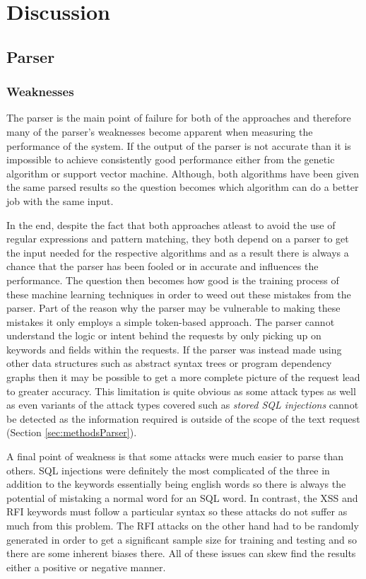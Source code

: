 \chapter{Discussion} \label{sec:sectionSeven}

\section{Parser}
\subsection{Weaknesses}\label{sec:parseWeak}

The parser is the main point of failure for both of the approaches and therefore many of the parser's weaknesses become apparent when measuring the performance of the system.  If the output of the parser is not accurate than it is impossible to achieve consistently good performance either from the genetic algorithm or support vector machine. Although, both algorithms have been given the same parsed results so the question becomes which algorithm can do a better job with the same input.  

In the end, despite the fact that both approaches atleast to avoid the use of regular expressions and pattern matching, they both depend on a parser to get the input needed for the respective algorithms and as a result there is always a chance that the parser has been fooled or in accurate and influences the performance.  The question then becomes how good is the training process of these machine learning techniques in order to weed out these mistakes from the parser.  Part of the reason why the parser may be vulnerable to making these mistakes it only employs a simple token-based approach.  The parser cannot understand the logic or intent behind the requests by only picking up on keywords and fields within the requests.  If the parser was instead made using other data structures such as abstract syntax trees or program dependency graphs then it may be possible to get a more complete picture of the request lead to greater accuracy.  This limitation is quite obvious as some attack types as well as even variants of the attack types covered such as \textit{stored SQL injections} cannot be detected as the information required is outside of the scope of the text request (Section \ref{sec:methodsParser}). 

A final point of weakness is that some attacks were much easier to parse than others.  SQL injections were definitely the most complicated of the three in addition to the keywords essentially being english words so there is always the potential of mistaking a normal word for an SQL word.  In contrast, the XSS and RFI keywords must follow a particular syntax so these attacks do not suffer as much from this problem.  The RFI attacks on the other hand had to be randomly generated in order to get a significant sample size for training and testing and so there are some inherent biases there.  All of these issues can skew find the results either a positive or negative manner.


